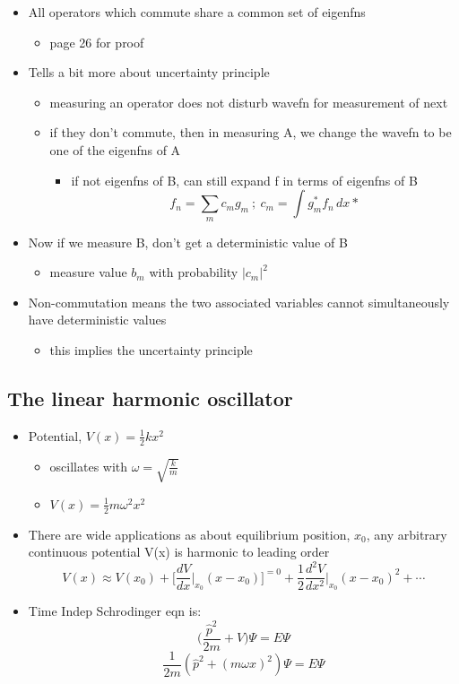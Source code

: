 \documentclass[a4paper,11pt,normalem]{article}
\begin{document}
\begin{itemize}
\item
  All operators which commute share a common set of eigenfns
  \begin{itemize}
  \item
    page 26 for proof
  \end{itemize}
\item
  Tells a bit more about uncertainty principle
  \begin{itemize}
  \item
    measuring an operator does not disturb wavefn for measurement of
    next
  \item
    if they don't commute, then in measuring A, we change the wavefn to
    be one of the eigenfns of A
    \begin{itemize}
    \item
      if not eigenfns of B, can still expand f in terms of eigenfns of B
      \[
      f_n = \sum_{m} c_{m}g_m ~;~ c_{m} = \int g_{m}^{*}f_{n}\,dx*
      \]
    \end{itemize}
  \end{itemize}
\item
  Now if we measure B, don't get a deterministic value of B
  \begin{itemize}
  \item
    measure value \(b_m\) with probability \(|c_{m}|^2\)
  \end{itemize}
\item
  Non-commutation means the two associated variables cannot
  simultaneously have deterministic values
  \begin{itemize}
  \item
    this implies the uncertainty principle
  \end{itemize}
\end{itemize}

\subsection{The linear harmonic oscillator}\label{the-linear-harmonic-oscillator}

\begin{itemize}
\item
  Potential, \(V(x) = \frac{1}{2}kx^2\)
  \begin{itemize}
  \item
    oscillates with \(\omega = \sqrt{\frac{k}{m}}\)
  \item
    \(V(x) = \frac{1}{2}m\omega^{2}x^2\)
  \end{itemize}
\item
  There are wide applications as about equilibrium position, \(x_0\), any arbitrary continuous potential V(x) is harmonic to leading order \[
  V(x) \approx V(x_{0}) + \Bigg[\frac{dV}{dx}\Big|_{x_{0}} (x - x_{0}) \Bigg]^{= 0} + \frac{1}{2}\frac{d^{2}V}{dx^2}\Big|_{x_{0}} (x - x_{0})^2 + \cdots
  \]
\item
  Time Indep Schrodinger eqn is: \[
  \Big(\frac{\hat{p}^2}{2m} + V\Big)\Psi = E\Psi
  \] \[
  \frac{1}{2m}(\hat{p}^2 + (m\omega x)^2)\Psi = E\Psi
  \]
\end{itemize}
\end{document}
